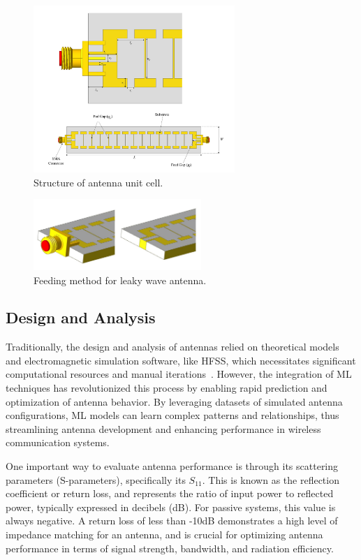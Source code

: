 \documentclass[conference]{IEEEtran}
\begin{document}
\begin{figure}[h]
\begin{center}
\noindent
    \includegraphics[width=3in]{LWA.png}
    \caption{Structure of antenna unit cell.}\label{LWA}
\end{center}
\end{figure}

\begin{figure}[h]
\begin{center}
\noindent
    \includegraphics[width=2.5in]{Feeding Method.jpg}
    \caption{Feeding method for leaky wave antenna.}\label{LWA_feed}
\end{center}
\end{figure}

\subsection{Design and Analysis}
Traditionally, the design and analysis of antennas relied on theoretical models and electromagnetic simulation software, like HFSS, which necessitates significant computational resources and manual iterations~\cite{john_antenna_2009,ranjan_design_2023,liu_efficient_2014}. However, the integration of ML techniques has revolutionized this process by enabling rapid prediction and optimization of antenna behavior. By leveraging datasets of simulated antenna configurations, ML models can learn complex patterns and relationships, thus streamlining antenna development and enhancing performance in wireless communication systems.

One important way to evaluate antenna performance is through its scattering parameters (S-parameters), specifically its $S_{11}$. This is known as the reflection coefficient or return loss, and represents the ratio of input power to reflected power, typically expressed in decibels (dB). For passive systems, this value is always negative. A return loss of less than -10dB demonstrates a high level of impedance matching for an antenna, and is crucial for optimizing antenna performance in terms of signal strength, bandwidth, and radiation efficiency. 
\end{document}
